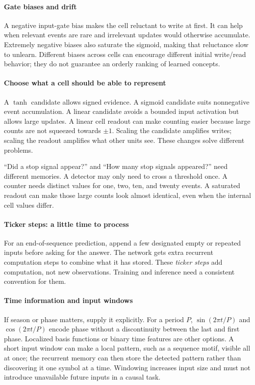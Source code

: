\documentclass[11pt, oneside]{book}
\begin{document}
\paragraph{Gate biases and drift} A negative input-gate bias makes the cell reluctant to write at first. It can help when relevant events are rare and irrelevant updates would otherwise accumulate. Extremely negative biases also saturate the sigmoid, making that reluctance slow to unlearn. Different biases across cells can encourage different initial write/read behavior; they do not guarantee an orderly ranking of learned concepts.

\paragraph{Choose what a cell should be able to represent} A $\tanh$ candidate allows signed evidence. A sigmoid candidate suits nonnegative event accumulation. A linear candidate avoids a bounded input activation but allows large updates. A linear cell readout can make counting easier because large counts are not squeezed towards $\pm1$. Scaling the candidate amplifies writes; scaling the readout amplifies what other units see. These changes solve different problems.

\begin{intbox}[title={Counting versus detecting}]
``Did a stop signal appear?'' and ``How many stop signals appeared?'' need different memories. A detector may only need to cross a threshold once. A counter needs distinct values for one, two, ten, and twenty events. A saturated readout can make those large counts look almost identical, even when the internal cell values differ.
\end{intbox}

\paragraph{Ticker steps: a little time to process} For an end-of-sequence prediction, append a few designated empty or repeated inputs before asking for the answer. The network gets extra recurrent computation steps to combine what it has stored. These \emph{ticker steps} add computation, not new observations. Training and inference need a consistent convention for them.

\paragraph{Time information and input windows} If season or phase matters, supply it explicitly. For a period $P$, $\sin(2\pi t/P)$ and $\cos(2\pi t/P)$ encode phase without a discontinuity between the last and first phase. Localized basis functions or binary time features are other options. A short input window can make a local pattern, such as a sequence motif, visible all at once; the recurrent memory can then store the detected pattern rather than discovering it one symbol at a time. Windowing increases input size and must not introduce unavailable future inputs in a causal task.
\end{document}
